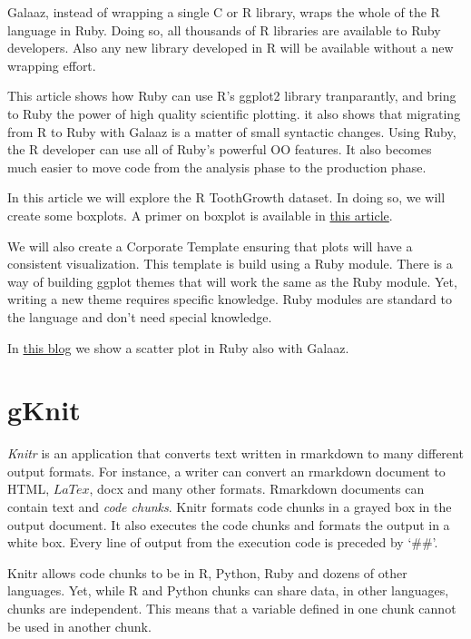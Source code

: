 \documentclass[11pt,]{article}
\begin{document}
Galaaz, instead of wrapping a single C or R library, wraps the whole of
the R language in Ruby. Doing so, all thousands of R libraries are
available to Ruby developers. Also any new library developed in R will
be available without a new wrapping effort.

This article shows how Ruby can use R's ggplot2 library tranparantly,
and bring to Ruby the power of high quality scientific plotting. it also
shows that migrating from R to Ruby with Galaaz is a matter of small
syntactic changes. Using Ruby, the R developer can use all of Ruby's
powerful OO features. It also becomes much easier to move code from the
analysis phase to the production phase.

In this article we will explore the R ToothGrowth dataset. In doing so,
we will create some boxplots. A primer on boxplot is available in
\href{https://towardsdatascience.com/understanding-boxplots-5e2df7bcbd51}{this
article}.

We will also create a Corporate Template ensuring that plots will have a
consistent visualization. This template is build using a Ruby module.
There is a way of building ggplot themes that will work the same as the
Ruby module. Yet, writing a new theme requires specific knowledge. Ruby
modules are standard to the language and don't need special knowledge.

In
\href{https://towardsdatascience.com/ruby-plotting-with-galaaz-an-example-of-tightly-coupling-ruby-and-r-in-graalvm-520b69e21021}{this
blog} we show a scatter plot in Ruby also with Galaaz.

\section{gKnit}\label{gknit}

\emph{Knitr} is an application that converts text written in rmarkdown
to many different output formats. For instance, a writer can convert an
rmarkdown document to HTML, \(LaTex\), docx and many other formats.
Rmarkdown documents can contain text and \emph{code chunks}. Knitr
formats code chunks in a grayed box in the output document. It also
executes the code chunks and formats the output in a white box. Every
line of output from the execution code is preceded by `\#\#'.

Knitr allows code chunks to be in R, Python, Ruby and dozens of other
languages. Yet, while R and Python chunks can share data, in other
languages, chunks are independent. This means that a variable defined in
one chunk cannot be used in another chunk.
\end{document}
